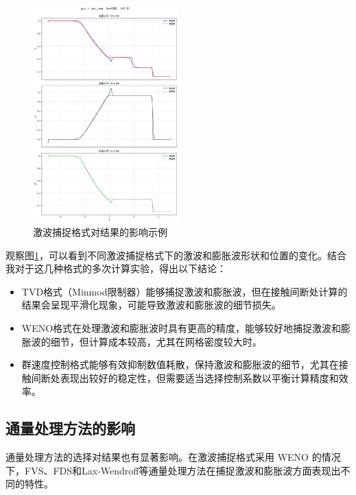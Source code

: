 \documentclass[UTF8]{ctexart}
\begin{document}
\begin{figure}
    \includegraphics[width=0.5\textwidth]{gvc.png}
    \caption{激波捕捉格式对结果的影响示例}
    \label{fig:shock_capturing_effect}
\end{figure}
观察图\ref{fig:shock_capturing_effect}，可以看到不同激波捕捉格式下的激波和膨胀波形状和位置的变化。结合我对于这几种格式的多次计算实验，得出以下结论：
\begin{itemize}
    \item TVD格式（Minmod限制器）能够捕捉激波和膨胀波，但在接触间断处计算的结果会呈现平滑化现象，可能导致激波和膨胀波的细节损失。
    \item WENO格式在处理激波和膨胀波时具有更高的精度，能够较好地捕捉激波和膨胀波的细节，但计算成本较高，尤其在网格密度较大时。
    \item 群速度控制格式能够有效抑制数值耗散，保持激波和膨胀波的细节，尤其在接触间断处表现出较好的稳定性，但需要适当选择控制系数以平衡计算精度和效率。
\end{itemize}
\subsection{通量处理方法的影响}
通量处理方法的选择对结果也有显著影响。在激波捕捉格式采用 WENO 的情况下，FVS、FDS和Lax-Wendroff等通量处理方法在捕捉激波和膨胀波方面表现出不同的特性。
\end{document}
